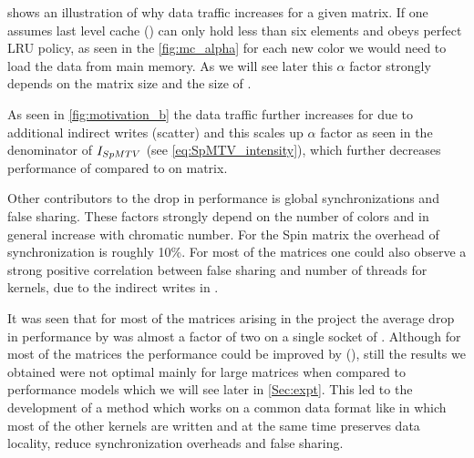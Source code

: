     shows an illustration of why data traffic increases for a given matrix. If one assumes last level cache (\LLC) can only hold less than six elements and obeys perfect LRU policy, as seen in the \cref{fig:mc_alpha} for  each new color we would need to load the data from main memory. As we will see later this $\alpha$ factor strongly depends on the matrix size and the size of \LLC.
  
 As seen in \cref{fig:motivation_b} the data traffic further increases for \SpMTV due to additional indirect writes (scatter) and this scales up $\alpha$ factor as seen in the denominator of $I_{SpMTV}$ (see \cref{eq:SpMTV_intensity}),  which further decreases performance of \SpMTV compared to \SpMV on \MC matrix. 
 
 Other contributors to the drop in performance is global synchronizations and false sharing. These factors strongly depend on the number of colors and in general increase with chromatic number. For the Spin matrix the overhead of synchronization is roughly 10\%.  For most of the matrices one could also observe a strong positive correlation between false sharing and number of threads for \SpMTV kernels, due to the indirect writes in \SpMTV.

It was seen that for most of the matrices arising in the project the average drop in performance by \MCfull was almost a factor of two on a single socket of \IVB. Although for most of the matrices the performance could be improved by \ABMCfull (\ABMC), still the results we obtained were not optimal mainly for large matrices when compared to performance models which we will see later in \cref{Sec:expt}. This led to the development of a method which works on a common data format like \CRS in which most of the other kernels are written and at the same time preserves data locality, reduce synchronization overheads and false sharing.


 

